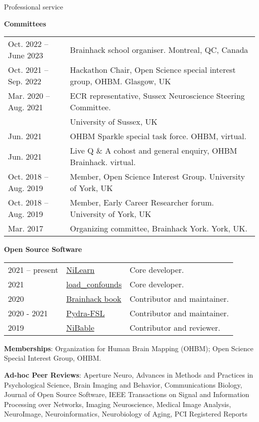 \documentclass{resume} %
\begin{document}
\begin{rSection}{Professional service}

\textbf{Committees}

\begin{tabular}{@{} l l @{\hspace{6ex}}}
  Oct. 2022 -- June 2023 & Brainhack school organiser. Montreal, QC, Canada \\
  Oct. 2021 -- Sep. 2022 & Hackathon Chair, Open Science special interest group, OHBM. Glasgow, UK \\
  Mar. 2020 -- Aug. 2021 & ECR representative, Sussex Neuroscience Steering Committee. \\
   & University of Sussex, UK\\
  Jun. 2021 & OHBM Sparkle special task force. OHBM, virtual. \\
  Jun. 2021 & Live Q \& A cohost and general enquiry, OHBM Brainhack. virtual. \\
  Oct. 2018 -- Aug. 2019 & Member, Open Science Interest Group. University of York, UK\\
  Oct. 2018 -- Aug. 2019 & Member, Early Career Researcher forum. University of York, UK\\
  Mar. 2017 & Organizing committee, Brainhack York. York, UK.\\
\end{tabular}

\textbf{Open Source Software}

\begin{tabular}{@{} l l l @{\hspace{6ex}}}
  2021 -- present & \href{https://github.com/nilearn/nilearn}{NiLearn} & Core developer.\\
  2021 & \href{https://github.com/SIMEXP/load_confounds}{load\_confounds} & Core developer.\\
  2020 & \href{https://github.com/brainhackorg/brainhack_jupyter_book}{Brainhack book} & Contributor and maintainer. \\
  2020 - 2021 & \href{https://github.com/nipype/pydra-fsl}{Pydra-FSL} & Contributor and maintainer. \\
  2019 & \href{https://github.com/nipy/nibabel/pull/793}{NiBable} & Contributor and reviewer.\\
\end{tabular}

\textbf{Memberships}: Organization for Human Brain Mapping (OHBM); Open Science Special Interest Group, OHBM.

\textbf{Ad-hoc Peer Reviews}: Aperture Neuro,
Advances in Methods and Practices in Psychological Science,
Brain Imaging and Behavior,
Communications Biology,
Journal of Open Source Software,
IEEE Transactions on Signal and Information Processing over Networks,
Imaging Neuroscience,
Medical Image Analysis,
NeuroImage,
Neuroinformatics,
Neurobiology of Aging,
PCI Registered Reports
\end{rSection}
\end{document}
